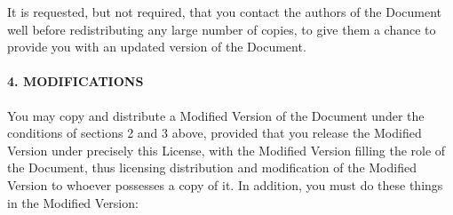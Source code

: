 It is requested, but not required, that you contact the authors of the
Document well before redistributing any large number of copies, to give
them a chance to provide you with an updated version of the Document.

\hypertarget{4-modifications}{%
\paragraph{4. MODIFICATIONS}\label{4-modifications}}

You may copy and distribute a Modified Version of the Document under the
conditions of sections 2 and 3 above, provided that you release the
Modified Version under precisely this License, with the Modified Version
filling the role of the Document, thus licensing distribution and
modification of the Modified Version to whoever possesses a copy of it.
In addition, you must do these things in the Modified Version:

